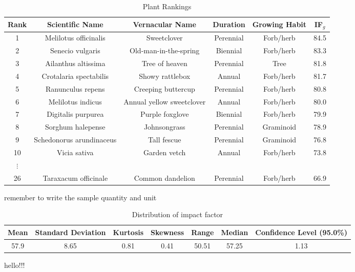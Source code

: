 \documentclass[12pt]{article}
\begin{document}
		{
			\fontsize{10}{14}\selectfont
			{
				\begin{longtable}{cccccc}
					\caption{Plant Rankings}
					\label{tb:ranks}\\
					
					\toprule
					Rank&Scientific Name&Vernacular Name&Duration&Growing Habit&IF$_g$\\
					\toprule
					1&Melilotus officinalis&Sweetclover&Perennial&Forb/herb&84.5\\
					2&Senecio vulgaris&Old-man-in-the-spring&Biennial&Forb/herb&83.3\\
					3&Ailanthus altissima&Tree of heaven&Perennial&Tree&81.8\\
					4&Crotalaria spectabilis&Showy rattlebox&Annual&Forb/herb&81.7\\
					5&Ranunculus repens&Creeping buttercup&Perennial&Forb/herb&80.8\\
					6&Melilotus indicus&Annual yellow sweetclover&Annual&Forb/herb&80.0\\
					7&Digitalis purpurea&Purple foxglove&Biennial&Forb/herb&79.9\\
					8&Sorghum halepense&Johnsongrass&Perennial&Graminoid&78.9\\
					9&Schedonorus arundinaceus&Tall fescue&Perennial&Graminoid&76.8\\
					10&Vicia sativa&Garden vetch&Annual&Forb/herb&73.8\\
					$\vdots$\\
					26&Taraxacum officinale&Common dandelion&Perennial&Forb/herb&66.9\\
					\bottomrule
				\end{longtable}
			}
		}
		
		remember to write the sample quantity and unit \\

		{
			\fontsize{10}{14}\selectfont
			{
				\begin{longtable}{ccccccc}
					\caption{Distribution of impact factor}
					\label{tb:IFDistribution}\\
					
					\toprule
					Mean&Standard Deviation&Kurtosis&Skewness&Range&Median&Confidence Level (95.0\%)\\
					\toprule
					57.9&8.65&0.81&0.41&50.51&57.25&1.13\\
					\bottomrule
				\end{longtable}
			}
		}
		
		hello!!! \\
\end{document}
